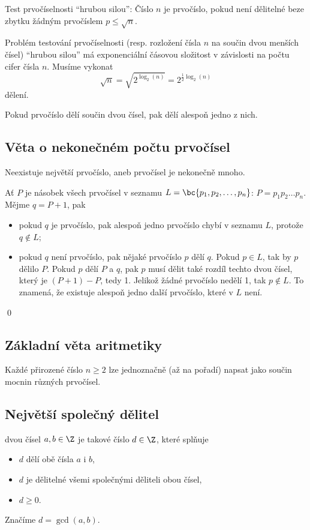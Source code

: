 Test prvočíselnosti \enquote{hrubou silou}: Číslo $n$ je prvočíslo, pokud není dělitelné beze zbytku žádným prvočíslem $p \leq \sqrt{n}$.

Problém testování prvočíselnosti (resp. rozložení čísla $n$ na součin dvou menších čísel) \enquote{hrubou silou} má exponenciální čásovou složitost v závislosti na počtu cifer čísla $n$. Musíme vykonat
\begin{equation}
	\sqrt{n} = \sqrt{2^{\log_2(n)}} = 2^{\frac{1}{2}\log_2(n)}
\end{equation}
dělení.

Pokud prvočíslo dělí součin dvou čísel, pak dělí alespoň jedno z nich.

\subsection{Věta o nekonečném počtu prvočísel}
 Neexistuje největší prvočíslo, aneb prvočísel je nekonečně mnoho.

\dukaz Ať $P$ je násobek všech prvočísel v seznamu $L = \bc{p_1, p_2, \dots, p_n}$: $P = p_1 p_2 \dots p_n$. Mějme $q = P + 1$, pak
\vspace{-1em}
\begin{itemize}
	\item pokud $q$ je prvočíslo, pak alespoň jedno prvočíslo chybí v seznamu $L$, protože $q \not\in L$;
	\item pokud $q$ není prvočíslo, pak nějaké prvočíslo $p$ dělí $q$. Pokud $p \in L$, tak by $p$ dělilo $P$. Pokud $p$ dělí $P$ a $q$, pak $p$ musí dělit také rozdíl techto dvou čísel, který je $(P + 1) - P$, tedy 1. Jelikož žádné prvočíslo nedělí 1, tak $p \not\in L$. To znamená, že existuje alespoň jedno další prvočíslo, které v $L$ není.
\end{itemize}
\vspace{-1em}
\hspace{\fill}\qed

\subsection{Základní věta aritmetiky}
Každé přirozené číslo $n \geq 2$ lze jednoznačně (až na pořadí) napsat jako součin mocnin různých prvočísel.

\subsection{Největší společný dělitel}\label{gcd}
 dvou čísel $a, b \in \Z$ je takové číslo $d \in \Z$, které splňuje
\vspace{-1em}
\begin{itemize}
	\item $d$ dělí obě čísla $a$ i $b$,
	\item $d$ je dělitelné všemi společnými děliteli obou čísel,
	\item $d \geq 0$.
\end{itemize}
\vspace{-1em}
Značíme $d = \gcd(a,b)$.

